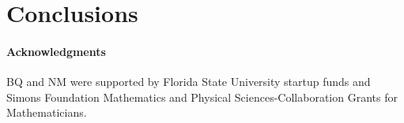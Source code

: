 \documentclass[preprint,10pt]{elsarticle}
\begin{document}
\section{Conclusions}
\label{sec:conclusions}


\paragraph{\bf Acknowledgments} BQ and NM were supported by Florida
State University startup funds and Simons Foundation Mathematics and
Physical Sciences-Collaboration Grants for Mathematicians.

 

\end{document}

